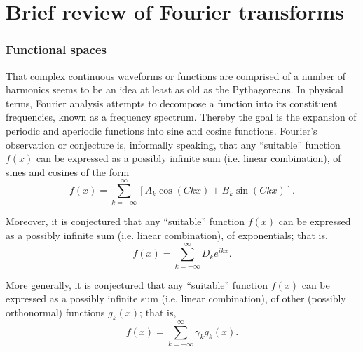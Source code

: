 \chapter{Brief review of Fourier transforms}

\subsection{Functional spaces}

That complex continuous waveforms or functions are comprised
of a number of harmonics seems to be an idea at least as old as the Pythagoreans.
In physical terms, Fourier analysis \cite{koerner,Howell,herman-fa}
attempts to decompose a function into its constituent frequencies, known as a frequency spectrum.
Thereby the goal is the expansion of periodic and aperiodic functions into sine and cosine functions.
Fourier's observation or conjecture is, informally speaking, that any   ``suitable''
function $f(x)$
can be expressed as a  possibly infinite  sum (i.e. linear combination), of sines
and cosines of the form
\begin{equation}
f(x)= \sum_{k=-\infty}^\infty
\left[ A_k \cos (C k x) + B_k \sin (C k x)\right].
\label{2012-m-ch-fourier_conjecture}
\end{equation}

Moreover, it is conjectured that any ``suitable''
function $f(x)$
can be expressed as a  possibly infinite  sum (i.e. linear combination), of exponentials; that is,
\begin{equation}
f(x)= \sum_{k=-\infty}^\infty
D_k e^{ikx}.
\label{2012-m-ch-fourier_conjecture1}
\end{equation}

More generally, it is conjectured that any ``suitable''
function $f(x)$
can be expressed as a  possibly infinite  sum (i.e. linear combination), of other (possibly orthonormal) functions $g_k( x)$; that is,
\begin{equation}
f(x)= \sum_{k=-\infty}^\infty
\gamma_k g_k(x).
\label{2012-m-ch-fourier_conjecturegen}
\end{equation}

